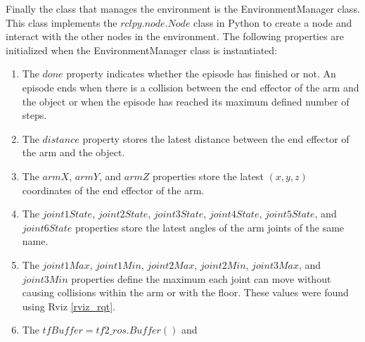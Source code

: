 \documentclass[12pt,oneside]{article}
\begin{document}
Finally the class that manages the environment is the EnvironmentManager class. This class implements the $rclpy.node.Node$ class in Python to create a node and interact with the other nodes in the environment.
The following properties are initialized when the EnvironmentManager class is instantiated:
\begin{enumerate}
\item The $done$ property indicates whether the episode has finished or not. An episode ends when there is a collision between the end effector of the arm and the object or when the episode has reached its maximum defined number of steps.
\item\label{env-manager:distance} The $distance$ property stores the latest distance between the end effector of the arm and the object.
\item\label{env-manager:arm-coordinates} The $armX$, $armY$, and $armZ$ properties store the latest $(x, y, z)$ coordinates of the end effector of the arm.
\item The $joint1State$, $joint2State$, $joint3State$, $joint4State$, $joint5State$, and $joint6State$ properties store the latest angles of the arm joints of the same name. 
\item The $joint1Max$, $joint1Min$, $joint2Max$, $joint2Min$, $joint3Max$, and $joint3Min$ properties define the maximum each joint can move without causing collisions within the arm or with the floor. These values were found using Rviz \ref{rviz_rqt}.
\item The $tfBuffer = tf2\_ros.Buffer()$ and


\end{enumerate}
\end{document}
